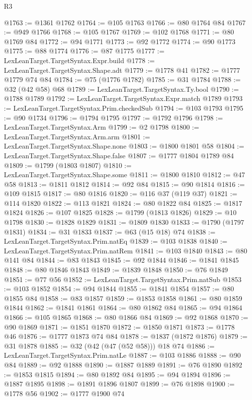 \begin{lexlean}{R3}
\begin{coremodule}
@1763 := @1361 @1762
@1764 := @105 @1763
@1766 := @80 @1764 @84
@1767 := @949 @1766
@1768 := @105 @1767
@1769 := @102 @1768
@1771 := @80 @1769 @84
@1772 := @94 @1771
@1773 := @92 @1772
@1774 := @90 @1773
@1775 := @88 @1774
@1776 := @87 @1775
@1777 := LexLeanTarget.TargetSyntax.Expr.build
@1778 := LexLeanTarget.TargetSyntax.Shape.adt
@1779 := @1778 @41
@1782 := @1777 @1779 @74 @84
@1784 := @75 (@1776 @1782)
@1785 := @31 @1784
@1788 := @32 (@42 @58) @68
@1789 := LexLeanTarget.TargetSyntax.Ty.bool
@1790 := @1788 @1789
@1792 := LexLeanTarget.TargetSyntax.Expr.match @1789
@1793 := LexLeanTarget.TargetSyntax.Prim.checkedSub
@1794 := @103 @1793
@1795 := @90 @1734
@1796 := @1794 @1795
@1797 := @1792 @1796
@1798 := LexLeanTarget.TargetSyntax.Arm
@1799 := @2 @1798
@1800 := LexLeanTarget.TargetSyntax.Arm.arm
@1801 := LexLeanTarget.TargetSyntax.Shape.none
@1803 := @1800 @1801 @58
@1804 := LexLeanTarget.TargetSyntax.Shape.false
@1807 := @1777 @1804 @1789 @84
@1809 := @1799 (@1803 @1807)
@1810 := LexLeanTarget.TargetSyntax.Shape.some
@1811 := @1800 @1810
@1812 := @47 @58
@1813 := @1811 @1812
@1814 := @92 @84
@1815 := @90 @1814
@1816 := @109 @1815
@1817 := @80 @1816
@1820 := @116 @37 (@119 @37)
@1821 := @114 @1820
@1822 := @113 @1821
@1824 := @80 @1822 @84
@1825 := @1817 @1824
@1826 := @107 @1825
@1828 := @1799 (@1813 @1826)
@1829 := @10 @1798
@1830 := @1828 @1829
@1831 := @1809 @1830
@1833 := @1790 (@1797 @1831)
@1834 := @31 @1833
@1837 := @63 (@15 @18) @74
@1838 := LexLeanTarget.TargetSyntax.Prim.natEq
@1839 := @103 @1838
@1840 := LexLeanTarget.TargetSyntax.Prim.natRem
@1841 := @103 @1840
@1843 := @80 @141 @84
@1844 := @83 @1843
@1845 := @92 @1844
@1846 := @1841 @1845
@1848 := @80 @1846 @1843
@1849 := @1839 @1848
@1850 := @76 @1849
@1851 := @77 @56
@1852 := LexLeanTarget.TargetSyntax.Prim.natSub
@1853 := @103 @1852
@1854 := @94 @1844
@1855 := @1841 @1854
@1857 := @80 @1855 @84
@1858 := @83 @1857
@1859 := @1853 @1858
@1861 := @80 @1859 @1844
@1862 := @1841 @1861
@1864 := @80 @1862 @84
@1865 := @94 @1864
@1866 := @105 @1865
@1868 := @80 @1866 @84
@1869 := @92 @1868
@1870 := @90 @1869
@1871 := @1851 @1870
@1872 := @1850 @1871
@1873 := @1778 @46
@1876 := @1777 @1873 @74 @84
@1878 := @1837 (@1872 @1876)
@1879 := @31 @1878
@1885 := @32 (@42 (@47 (@52 @58))) @18 @74
@1886 := LexLeanTarget.TargetSyntax.Prim.natLe
@1887 := @103 @1886
@1888 := @90 @84
@1889 := @92 @1888
@1890 := @1887 @1889
@1891 := @76 @1890
@1892 := @1853 @1815
@1894 := @80 @1892 @84
@1895 := @94 @1894
@1896 := @1887 @1895
@1898 := @1891 @1896 @1807
@1899 := @76 @1898
@1900 := @1778 @56
@1902 := @1777 @1900 @74

\end{coremodule}
\end{lexlean}
